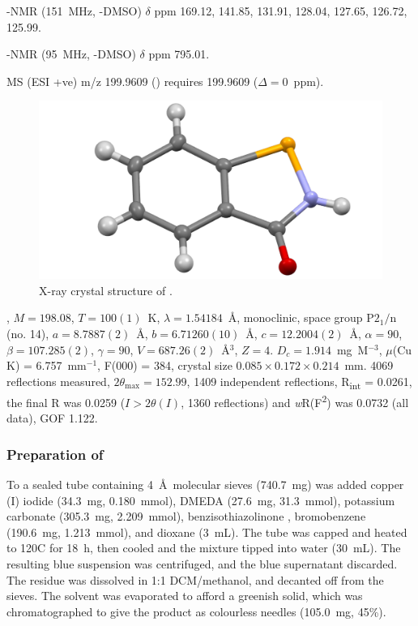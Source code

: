 \begin{refsection}
-NMR (151~MHz, -DMSO) $\delta$ ppm 169.12, 141.85, 131.91, 128.04, 127.65, 126.72, 125.99.

-NMR (95~MHz, -DMSO) $\delta$ ppm 795.01.

MS (ESI +ve) m/z 199.9609 ()  requires 199.9609 ($\Delta=0$~ppm).

\begin{figure}
    \includegraphics[width=0.8\linewidth]{Figures/ebs-h-xtal.pdf}
    \caption{X-ray crystal structure of .}
\end{figure}

, $M=198.08$, $T=100(1)$~K, $\lambda=1.54184$~\AA, monoclinic, space group $\text{P}2_1/\text{n}$ (no. 14), $a = 8.7887(2)$~\AA, $b = 6.71260(10)$~\AA, $c = 12.2004(2)$~\AA, $\alpha = 90$\degree, $\beta = 107.285(2)$\degree, $\gamma = 90$\degree, $V = 687.26(2)$~\AA$^{3}$, $Z = 4$. $D_{c}= 1.914$~mg~M$^{-3}$, $\mu$(Cu K\a) = 6.757~mm$^{-1}$, F(000) = 384, crystal size $0.085 \times 0.172 \times 0.214$~mm. 4069 reflections measured, $2\theta_{\max}=152.99$\degree, 1409 independent reflections, R\textsubscript{int} = 0.0261, the final R was 0.0259 ($I > 2\theta(I)$, 1360 reflections) and \emph{w}R(F\textsuperscript{2}) was 0.0732 (all data), GOF 1.122. 

\subsubsection{Preparation of }
To a sealed tube containing 4~\AA\ molecular sieves (740.7~mg) was added copper (I) iodide (34.3~mg, 0.180~mmol), DMEDA (27.6~mg, 31.3~mmol), potassium carbonate (305.3~mg, 2.209~mmol), benzisothiazolinone , bromobenzene (190.6~mg, 1.213~mmol), and dioxane (3~mL).
The tube was capped and heated to 120\degree{}C for 18~h, then cooled and the mixture tipped into water (30~mL). The resulting blue suspension was centrifuged, and the blue supernatant discarded. The residue was dissolved in 1:1 DCM/methanol, and decanted off from the sieves.
The solvent was evaporated to afford a greenish solid, which was chromatographed to give the product as colourless needles (105.0~mg, 45\%).\autocite{Dahl2011}


\end{refsection}
